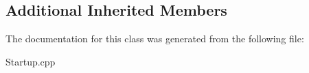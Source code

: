 \subsection*{Additional Inherited Members}


The documentation for this class was generated from the following file\+:\begin{DoxyCompactItemize}
\item 
Startup.\+cpp\end{DoxyCompactItemize}
